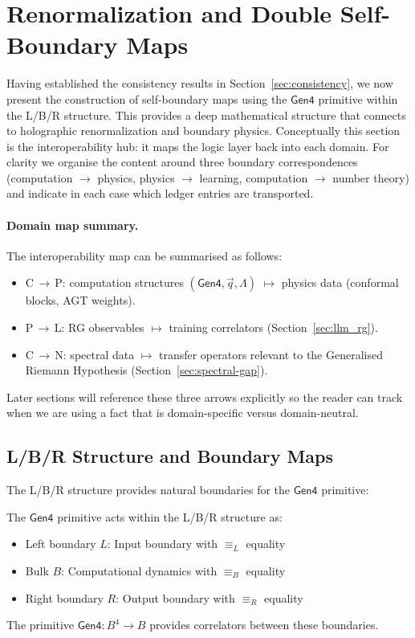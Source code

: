\section{Renormalization and Double Self-Boundary Maps}
\label{sec:boundary-maps}

Having established the consistency results in Section~\ref{sec:consistency}, we now present the construction of self-boundary maps using the $\mathsf{Gen4}$ primitive within the L/B/R structure. This provides a deep mathematical structure that connects to holographic renormalization and boundary physics. Conceptually this section is the interoperability hub: it maps the logic layer back into each domain. For clarity we organise the content around three boundary correspondences (computation $\rightarrow$ physics, physics $\rightarrow$ learning, computation $\rightarrow$ number theory) and indicate in each case which ledger entries are transported.

\paragraph{Domain map summary.} The interoperability map can be summarised as follows:
\begin{itemize}
  \item C\,$\to$\,P: computation structures $(\mathsf{Gen4},\vec{q},\Lambda)$ $\mapsto$ physics data (conformal blocks, AGT weights).
  \item P\,$\to$\,L: RG observables $\mapsto$ training correlators (Section~\ref{sec:llm_rg}).
  \item C\,$\to$\,N: spectral data $\mapsto$ transfer operators relevant to the Generalised Riemann Hypothesis (Section~\ref{sec:spectral-gap}).
\end{itemize}
Later sections will reference these three arrows explicitly so the reader can track when we are using a fact that is domain-specific versus domain-neutral.

\subsection{L/B/R Structure and Boundary Maps}

The L/B/R structure provides natural boundaries for the $\mathsf{Gen4}$ primitive:

\begin{definition}
\label{def:lbr-boundary}
The $\mathsf{Gen4}$ primitive acts within the L/B/R structure as:
\begin{itemize}
\item Left boundary $L$: Input boundary with $\equiv_L$ equality
\item Bulk $B$: Computational dynamics with $\equiv_B$ equality  
\item Right boundary $R$: Output boundary with $\equiv_R$ equality
\end{itemize}
The primitive $\mathsf{Gen4} : B^4 \to B$ provides correlators between these boundaries.
\end{definition}

